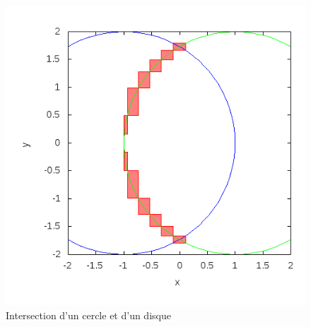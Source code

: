 \begin{figure}[h] %
  \center
\includegraphics[scale=0.50]{img/circle-disk}
  \caption{Intersection d'un cercle et d'un disque} %
 \label{fig:CercleDisque} %
\end{figure} %

\clearpage

